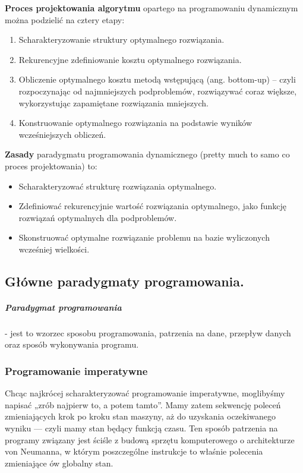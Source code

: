 \documentclass[a4paper,12pt,oneside]{book}
\begin{document}
				\textbf{Proces projektowania algorytmu} opartego na programowaniu dynamicznym można podzielić na cztery etapy: 
				\begin{enumerate}
					\item Scharakteryzowanie struktury optymalnego rozwiązania. 
					\item Rekurencyjne zdefiniowanie kosztu optymalnego rozwiązania.
					\item Obliczenie optymalnego kosztu metodą wstępującą (ang. bottom-up) – czyli rozpoczynając od najmniejszych podproblemów, rozwiązywać coraz większe, wykorzystując zapamiętane rozwiązania mniejszych.
					\item Konstruowanie optymalnego rozwiązania na podstawie wyników wcześniejszych obliczeń. 
				\end{enumerate}
			
				\textbf{Zasady} paradygmatu programowania dynamicznego (pretty much to samo co proces projektowania) to:
				\begin{itemize}
					\item Scharakteryzować strukturę rozwiązania optymalnego.
					\item Zdefiniować rekurencyjnie wartość rozwiązania optymalnego, jako funkcję rozwiązań optymalnych dla podproblemów.
					\item Skonstruować optymalne rozwiązanie problemu na bazie wyliczonych wcześniej wielkości.
				\end{itemize}
			
			\newpage\subsection{Główne paradygmaty programowania.}
				\subparagraph{Paradygmat programowania} - jest to wzorzec sposobu programowania, patrzenia na dane,
				przepływ danych oraz sposób wykonywania programu.
				
				\subsubsection{Programowanie imperatywne}
				Chcąc najkrócej scharakteryzować programowanie imperatywne, moglibyśmy napisać „zrób najpierw to, a potem tamto”. Mamy zatem sekwencję poleceń zmieniających krok po kroku stan maszyny, aż do uzyskania oczekiwanego wyniku — czyli mamy stan będący funkcją czasu. Ten sposób patrzenia na programy związany jest ściśle z budową sprzętu komputerowego o architekturze von Neumanna, w którym poszczególne instrukcje to właśnie polecenia zmieniające ów globalny stan.
				
\end{document}
